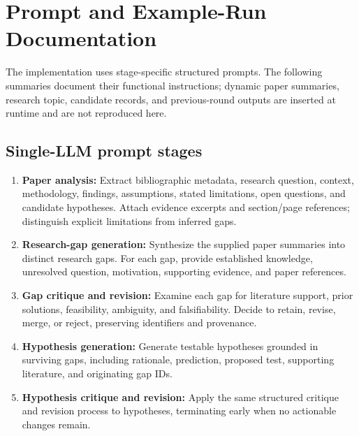 \documentclass[sigconf,review,anonymous=false]{acmart}
\begin{document}
\section{Prompt and Example-Run Documentation}\label{app:prompts}
The implementation uses stage-specific structured prompts. The following summaries document their functional instructions; dynamic paper summaries, research topic, candidate records, and previous-round outputs are inserted at runtime and are not reproduced here.

\subsection{Single-LLM prompt stages}
\begin{enumerate}[leftmargin=*]
  \item \textbf{Paper analysis:} Extract bibliographic metadata, research question, context, methodology, findings, assumptions, stated limitations, open questions, and candidate hypotheses. Attach evidence excerpts and section/page references; distinguish explicit limitations from inferred gaps.
  \item \textbf{Research-gap generation:} Synthesize the supplied paper summaries into distinct research gaps. For each gap, provide established knowledge, unresolved question, motivation, supporting evidence, and paper references.
  \item \textbf{Gap critique and revision:} Examine each gap for literature support, prior solutions, feasibility, ambiguity, and falsifiability. Decide to retain, revise, merge, or reject, preserving identifiers and provenance.
  \item \textbf{Hypothesis generation:} Generate testable hypotheses grounded in surviving gaps, including rationale, prediction, proposed test, supporting literature, and originating gap IDs.
  \item \textbf{Hypothesis critique and revision:} Apply the same structured critique and revision process to hypotheses, terminating early when no actionable changes remain.
\end{enumerate}
\end{document}
